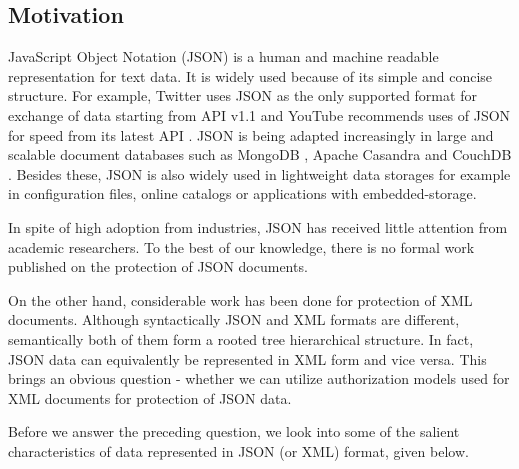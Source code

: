 \subsection{Motivation}
JavaScript Object Notation (JSON) is a human and machine readable representation for text data.  It is widely used because of its simple and concise structure.  For example, Twitter uses  JSON as the only supported format for exchange of data starting from API v1.1 \cite{twitter-api} and YouTube  recommends uses of JSON for speed from its latest API \cite{youtube-api}.  JSON  is being adapted increasingly in  large and scalable document databases such as MongoDB \cite{mongodb}, Apache Casandra \cite{cassandra} and CouchDB \cite{couchdb}. Besides  these, JSON is also widely used in lightweight data storages for example in configuration files, online catalogs or  applications with embedded-storage.



In spite of high adoption from industries, JSON has received little attention from academic researchers. To the best of our knowledge, there is no formal work published  on the protection of JSON documents.


On the other hand, considerable work has been done for protection of XML documents. Although syntactically JSON and XML formats are different, semantically both of them form a rooted tree hierarchical structure. In fact, JSON data can equivalently be represented in XML form and vice versa. This brings an obvious question -  whether we can utilize  authorization models used for XML documents for protection of  JSON data.


%

Before we answer the preceding question, we look into some of the salient characteristics of data represented in JSON (or XML) format, given below.  


